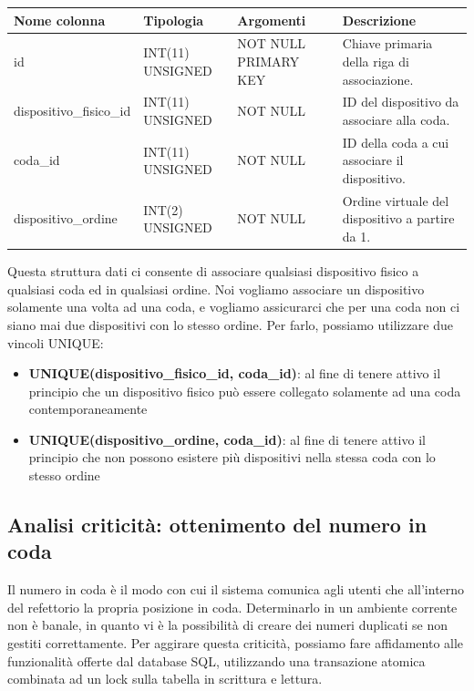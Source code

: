 \documentclass[a4paper, titlepage, 12pt, openright, twoside]{book}
\begin{document}
\begin{center}
    \begin{tabular}{ | l | l | p{3cm} | p{3cm} |}
    \hline
    Nome colonna & Tipologia & Argomenti & Descrizione \\ \hline
    id & INT(11) UNSIGNED & NOT NULL PRIMARY KEY & Chiave primaria della riga di associazione. \\ \hline
    dispositivo\_fisico\_id & INT(11) UNSIGNED & NOT NULL & ID del dispositivo da associare alla coda. \\ \hline
    coda\_id & INT(11) UNSIGNED & NOT NULL & ID della coda a cui associare il dispositivo. \\ \hline
    dispositivo\_ordine & INT(2) UNSIGNED & NOT NULL & Ordine virtuale del dispositivo a partire da 1. \\ \hline
    \end{tabular}
\end{center}

Questa struttura dati ci consente di associare qualsiasi dispositivo fisico a qualsiasi coda ed in qualsiasi ordine. Noi vogliamo associare un dispositivo solamente una volta ad una coda, e vogliamo assicurarci che per una coda non ci siano mai due dispositivi con lo stesso ordine. Per farlo, possiamo utilizzare due vincoli UNIQUE:
\begin{itemize}
	\item \textbf{UNIQUE(dispositivo\_fisico\_id, coda\_id)}: al fine di tenere attivo il principio che un dispositivo fisico può essere collegato solamente ad una coda contemporaneamente
	\item \textbf{UNIQUE(dispositivo\_ordine, coda\_id)}: al fine di tenere attivo il principio che non possono esistere più dispositivi nella stessa coda con lo stesso ordine
\end{itemize}

\subsection{Analisi criticità: ottenimento del numero in coda}

Il numero in coda è il modo con cui il sistema comunica agli utenti che all'interno del refettorio la propria posizione in coda. Determinarlo in un ambiente corrente non è banale, in quanto vi è la possibilità di creare dei numeri duplicati se non gestiti correttamente. Per aggirare questa criticità, possiamo fare affidamento alle funzionalità offerte dal database SQL, utilizzando una transazione atomica combinata ad un lock sulla tabella in scrittura e lettura.
\end{document}
